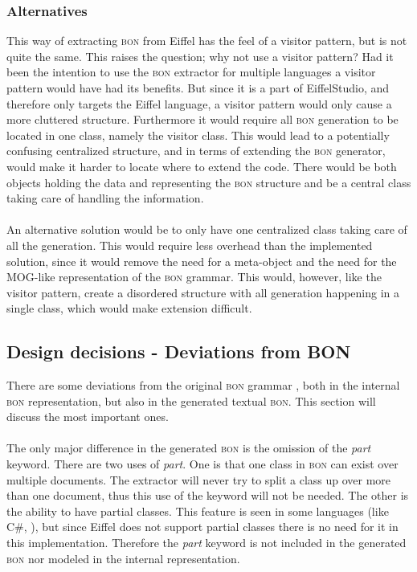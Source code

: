 \subsubsection{Alternatives}
This way of extracting \textsc{bon} from Eiffel has the feel of a visitor pattern, but is not quite the same. This raises the question; why not use a visitor pattern? Had it been the intention to use the \textsc{bon} extractor for multiple languages a visitor pattern would have had its benefits. But since it is a part of EiffelStudio, and therefore only targets the Eiffel language, a visitor pattern would only cause a more cluttered structure. Furthermore it would require all \textsc{bon} generation to be located in one class, namely the visitor class. This would lead to a potentially confusing centralized structure, and in terms of extending the \textsc{bon} generator, would make it harder to locate where to extend the code. There would be both objects holding the data and representing the \textsc{bon} structure and be a central class taking care of handling the information.
\paragraph{}
An alternative solution would be to only have one centralized class taking care of all the generation. This would require less overhead than the implemented solution, since it would remove the need for a meta-object and the need for the MOG-like representation of the \textsc{bon} grammar. This would, however, like the visitor pattern, create a disordered structure with all generation happening in a single class, which would make extension difficult.

\subsection{Design decisions - Deviations from BON}
\label{deviations_from_bon}There are some deviations from the original \textsc{bon} grammar \cite[pp.~352-359]{walden1995}, both in the internal \textsc{bon} representation, but also in the generated textual \textsc{bon}. This section will discuss the most important ones. 

\paragraph{}
\label{part}
The only major difference in the generated \textsc{bon} is the omission of the \textit{part} keyword. There are two uses of \textit{part}. One is that one class in \textsc{bon} can exist over multiple documents. The extractor will never try to split a class up over more than one document, thus this use of the keyword will not be needed. The other is the ability to have partial classes. This feature is seen in some languages (like C\#, \cite{msdn2009}), but since Eiffel does not support partial classes there is no need for it in this implementation. Therefore the \textit{part} keyword is not included in the generated \textsc{bon} nor modeled in the internal representation.

